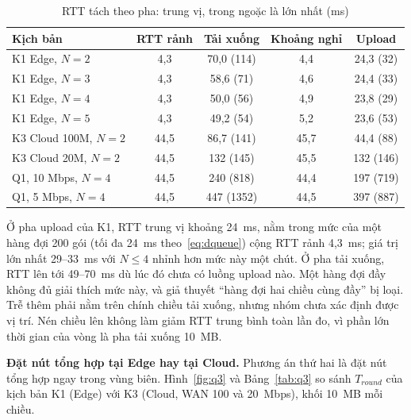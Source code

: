 \begin{table}[H]
    \centering
    \caption{RTT tách theo pha: trung vị, trong ngoặc là lớn nhất (ms)}
    \label{tab:rttphase}
    \begin{tabular}{l c c c c}
        \toprule
        \textbf{Kịch bản} & \textbf{RTT rảnh} & \textbf{Tải xuống} & \textbf{Khoảng nghỉ} & \textbf{Upload} \\
        \midrule
        K1 Edge, $N = 2$ & 4,3 & 70,0 (114) & 4,4 & 24,3 (32) \\
        K1 Edge, $N = 3$ & 4,3 & 58,6 (71) & 4,6 & 24,4 (33) \\
        K1 Edge, $N = 4$ & 4,3 & 50,0 (56) & 4,9 & 23,8 (29) \\
        K1 Edge, $N = 5$ & 4,3 & 49,2 (54) & 5,2 & 23,6 (53) \\
        K3 Cloud 100M, $N = 2$ & 44,5 & 86,7 (141) & 45,7 & 44,4 (88) \\
        K3 Cloud 20M, $N = 2$ & 44,5 & 132 (145) & 45,5 & 132 (146) \\
        Q1, 10 Mbps, $N = 4$ & 44,5 & 240 (818) & 44,4 & 197 (719) \\
        Q1, 5 Mbps, $N = 4$ & 44,5 & 447 (1352) & 44,5 & 397 (887) \\
        \bottomrule
    \end{tabular}
\end{table}

Ở pha upload của K1, RTT trung vị khoảng 24~ms, nằm trong mức của một hàng đợi 200 gói (tối đa 24~ms theo~\eqref{eq:dqueue}) cộng RTT rảnh 4{,}3~ms; giá trị lớn nhất 29--33~ms với $N \le 4$ nhỉnh hơn mức này một chút. Ở pha tải xuống, RTT lên tới 49--70~ms dù lúc đó chưa có luồng upload nào. Một hàng đợi đầy không đủ giải thích mức này, và giả thuyết ``hàng đợi hai chiều cùng đầy'' bị loại. Trễ thêm phải nằm trên chính chiều tải xuống, nhưng nhóm chưa xác định được vị trí. Nén chiều lên không làm giảm RTT trung bình toàn lần đo, vì phần lớn thời gian của vòng là pha tải xuống 10~MB.

\textbf{Đặt nút tổng hợp tại Edge hay tại Cloud.} Phương án thứ hai là đặt nút tổng hợp ngay trong vùng biên. Hình~\ref{fig:q3} và Bảng~\ref{tab:q3} so sánh $T_{round}$ của kịch bản K1 (Edge) với K3 (Cloud, WAN 100 và 20~Mbps), khối 10~MB mỗi chiều.

